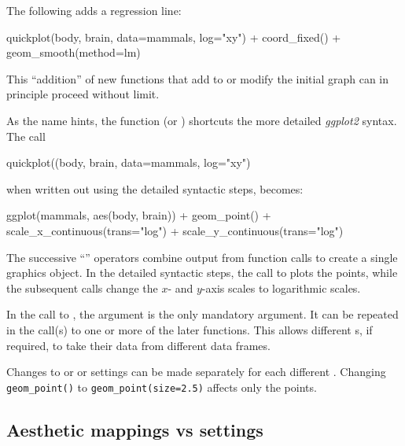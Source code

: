 The following adds a regression line:
\begin{Schunk}
\begin{Sinput}
quickplot(body, brain, data=mammals, log="xy") +
  coord_fixed() +
  geom_smooth(method=lm)
\end{Sinput}
\end{Schunk}
This ``addition'' of new functions that add to or modify the
initial graph can in principle proceed without limit.

As the name hints, the function  (or )
shortcuts the more detailed {\em ggplot2} syntax.  The call
\begin{Schunk}
\begin{Sinput}
quickplot((body, brain, data=mammals, log="xy")
\end{Sinput}
\end{Schunk}
when written out using the detailed syntactic steps, becomes:
\begin{Schunk}
\begin{Sinput}
ggplot(mammals, aes(body, brain)) +
  geom_point() +
  scale_x_continuous(trans="log") +
  scale_y_continuous(trans="log")
\end{Sinput}
\end{Schunk}
The successive ``\txtt{+}'' operators combine output from
function calls to create a single graphics object.  In the
detailed syntactic steps, the call to 
plots the points, while the subsequent calls change the
$x$- and $y$-axis scales to logarithmic scales.

In the call to , the  argument is the
only mandatory argument. It can be repeated in the call(s) to one
or more of the later  functions. This allows different
s, if required, to take their data from different data
frames.

Changes to  or  or  settings
can be made separately for each different .
Changing \verb!geom_point()!  to \verb!geom_point(size=2.5)! affects
only the points.

\subsection*{Aesthetic mappings vs settings}\label{ss:I(size)}

